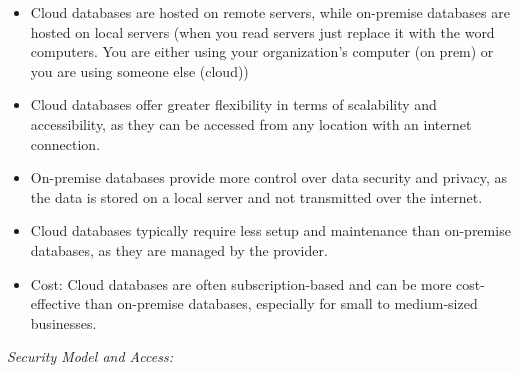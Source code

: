 \documentclass[
  letterpaper,
  DIV=11,
  numbers=noendperiod]{scrreprt}
\begin{document}
\begin{tcolorbox}
\begin{itemize}
\item
  Cloud databases are hosted on remote servers, while on-premise
  databases are hosted on local servers (when you read servers just
  replace it with the word computers. You are either using your
  organization's computer (on prem) or you are using someone else
  (cloud))
\item
  Cloud databases offer greater flexibility in terms of scalability and
  accessibility, as they can be accessed from any location with an
  internet connection.
\item
  On-premise databases provide more control over data security and
  privacy, as the data is stored on a local server and not transmitted
  over the internet.
\item
  Cloud databases typically require less setup and maintenance than
  on-premise databases, as they are managed by the provider.
\item
  Cost: Cloud databases are often subscription-based and can be more
  cost-effective than on-premise databases, especially for small to
  medium-sized businesses.
\end{itemize}

\emph{Security Model and Access:}


\end{tcolorbox}
\end{document}
